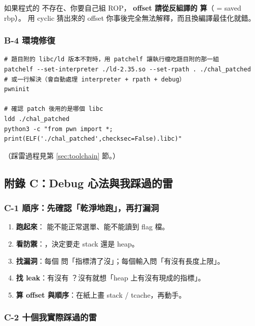 \begin{warnbox}
如果程式的  不存在、你要自己組 ROP，
\textbf{offset 請從反組譯的  算}（ = saved rbp）。
用 cyclic 猜出來的 offset 你事後完全無法解釋，而且換編譯最佳化就錯。
\end{warnbox}

\subsubsection*{B-4 環境修復}

\begin{lstlisting}[style=sh]
# 題目附的 libc/ld 版本不對時，用 patchelf 讓執行檔吃題目附的那一組
patchelf --set-interpreter ./ld-2.35.so --set-rpath . ./chal_patched
# 或一行解決（會自動處理 interpreter + rpath + debug）
pwninit

# 確認 patch 後用的是哪個 libc
ldd ./chal_patched
python3 -c "from pwn import *; print(ELF('./chal_patched',checksec=False).libc)"
\end{lstlisting}

（踩雷過程見第 \ref{sec:toolchain} 節。）

\subsection{附錄 C：Debug 心法與我踩過的雷}

\subsubsection*{C-1 順序：先確認「乾淨地跑」，再打漏洞}

\begin{enumerate}[leftmargin=1.5em,itemsep=2pt]
  \item \textbf{跑起來}： 能不能正常選單、能不能讀到 flag 檔。
  \item \textbf{看防禦}：，決定要走 stack 還是 heap。
  \item \textbf{找漏洞}：每個  問「指標清了沒」；每個輸入問「有沒有長度上限」。
  \item \textbf{找 leak}：有沒有 ？沒有就想「heap 上有沒有現成的指標」。
  \item \textbf{算 offset 與順序}：在紙上畫 stack / tcache，再動手。
\end{enumerate}

\subsubsection*{C-2 十個我實際踩過的雷}

